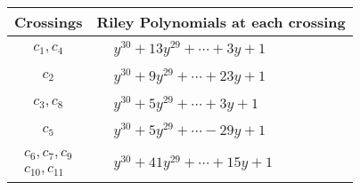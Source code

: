 \documentclass[1p]{elsarticle_modified}
\theoremstyle{definition}
\begin{document}
\begin{tabular}{m{50pt}|m{274pt}}
Crossings & \hspace{64pt}Riley Polynomials at each crossing \\
\hline $$\begin{aligned}c_{1},c_{4}\end{aligned}$$&$\begin{aligned}
&y^{30}+13 y^{29}+\cdots+3 y+1
\end{aligned}$\\
\hline $$\begin{aligned}c_{2}\end{aligned}$$&$\begin{aligned}
&y^{30}+9 y^{29}+\cdots+23 y+1
\end{aligned}$\\
\hline $$\begin{aligned}c_{3},c_{8}\end{aligned}$$&$\begin{aligned}
&y^{30}+5 y^{29}+\cdots+3 y+1
\end{aligned}$\\
\hline $$\begin{aligned}c_{5}\end{aligned}$$&$\begin{aligned}
&y^{30}+5 y^{29}+\cdots-29 y+1
\end{aligned}$\\
\hline $$\begin{aligned}c_{6},c_{7},c_{9}\\c_{10},c_{11}\end{aligned}$$&$\begin{aligned}
&y^{30}+41 y^{29}+\cdots+15 y+1
\end{aligned}$\\
\hline
\end{tabular}
\vskip 2pc
\end{document}
